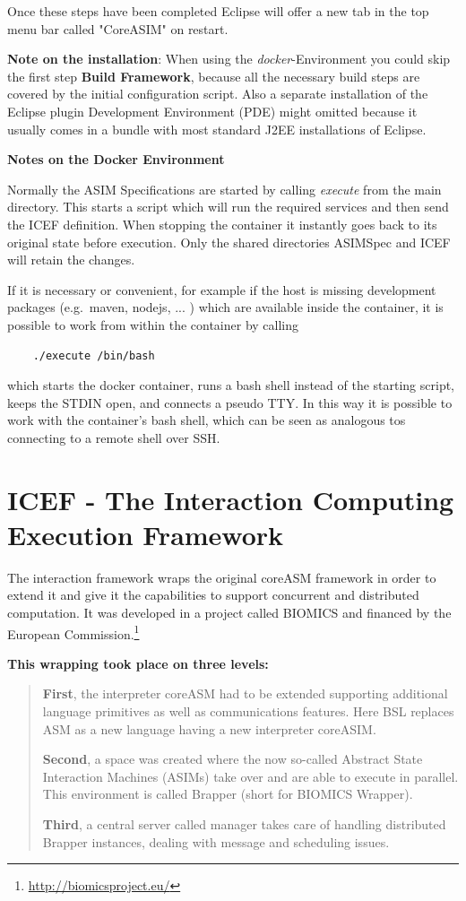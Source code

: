 Once these steps have been completed Eclipse will offer a new tab in the top menu bar called "CoreASIM" on restart.

\textbf{Note on the installation}: When using the \textit{docker}-Environment you could skip the first step \textbf{Build Framework}, because all the necessary build steps are covered by the initial configuration script. Also a separate installation of the Eclipse plugin Development Environment (PDE) might omitted because it usually comes in a bundle with most standard J2EE installations of Eclipse.

\textbf{Notes on the Docker Environment}
\label{sec_inner:note-docker}

Normally the ASIM Specifications are started by calling \textit{execute} from the main directory. This starts a script which will run the required services and then send the ICEF definition. When stopping the container it instantly goes back to its original state before execution. Only the shared directories ASIMSpec and ICEF will retain the changes.

If it is necessary or convenient, for example if the host is missing development packages (e.g.\ maven, nodejs, ... ) which are available inside the container, it is possible to work from within the container by calling
\begin{lstlisting}
	./execute /bin/bash
\end{lstlisting}
which starts the docker container, runs a bash shell instead of the starting script, keeps the STDIN open, and connects a pseudo TTY. In this way it is possible to work with the container's bash shell, which can be seen as analogous tos connecting to a remote shell over SSH.

\section{ICEF - The Interaction Computing Execution Framework}
\label{sec:icef-intro}

The interaction framework wraps the original coreASM framework in order to extend it and give it the capabilities to support concurrent and distributed computation. It was developed in a project called BIOMICS and financed by the European Commission.\footnote{\url{http://biomicsproject.eu/}}

\textbf{This wrapping took place on three levels:}
\begin{quote}
\vspace{-1.5cm}
\small
\textbf{First}, the interpreter coreASM had to be extended supporting additional language primitives as well as communications features. Here BSL replaces ASM as a new language having a new interpreter coreASIM.

\textbf{Second}, a space was created where the now so-called Abstract State Interaction Machines (ASIMs) take over and are able to execute in parallel. This environment is called Brapper (short for BIOMICS Wrapper).

\textbf{Third}, a central server called manager takes care of handling distributed Brapper instances, dealing with message and scheduling issues.
\vspace{-1cm}
\end{quote}

